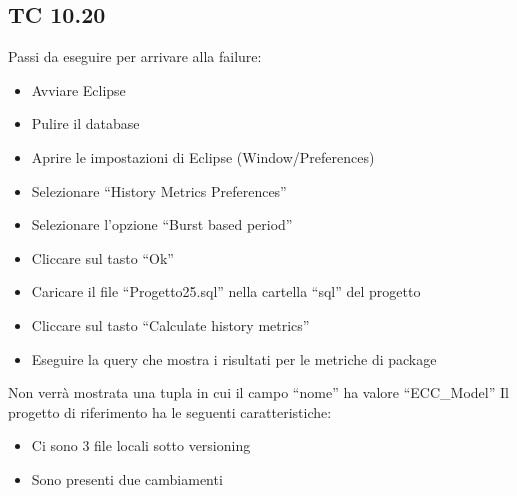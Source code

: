 \subsection*{TC 10.20}
Passi da eseguire per arrivare alla failure:
\begin{itemize}
 \item Avviare Eclipse
 \item Pulire il database
 \item Aprire le impostazioni di Eclipse (Window/Preferences)
 \item Selezionare ``History Metrics Preferences''
 \item Selezionare l'opzione ``Burst based period''
 \item Cliccare sul tasto ``Ok''
 \item Caricare il file ``Progetto25.sql'' nella cartella ``sql'' del progetto
 \item Cliccare sul tasto ``Calculate history metrics''
 \item Eseguire la query che mostra i risultati per le metriche di package
\end{itemize}
Non verrà mostrata una tupla in cui il campo ``nome'' ha valore ``ECC\_Model''
\vspace{0.5cm}
\newline
Il progetto di riferimento ha le seguenti caratteristiche:
\begin{itemize}
 \item Ci sono 3 file locali sotto versioning
 \item Sono presenti due cambiamenti
\end{itemize}





\newpage





